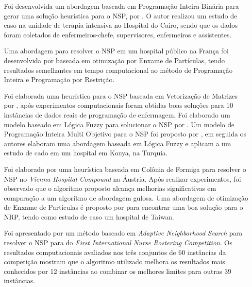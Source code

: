 Foi desenvolvida um abordagem baseada em Programação Inteira Binária para gerar uma solução heurística para o \ac{NSP}, por \cite{Zen-El-Din:2012}. O autor realizou um estudo de caso  na unidade de terapia intensiva no Hospital do Cairo, sendo que os dados foram coletados de enfermeiros-chefe, supervisores, enfermeiros e assistentes.

Uma abordagem para resolver o \ac{NSP} em um hospital público na França foi desenvolvida por \cite{altamirano:2010} baseada em otimização por Enxame de Partículas, tendo resultados semelhantes em tempo computacional ao método de Programação Inteira e Programação por Restrição.

Foi elaborada uma heurística para o \ac{NSP} baseada em Vetorização de Matrizes por \cite{yindong:2008}, após experimentos computacionais foram obtidas boas soluções para 10 instâncias de dados reais de programação de enfermagem. 
Foi elaborado um modelo baseado em Lógica Fuzzy para solucionar o \ac{NSP} por \cite{topaloglu:2010}.
Um modelo de Programação Inteira Multi Objetivo para o \ac{NSP} foi proposto por \cite{cetin:2015}, em seguida os autores elaboram uma abordagem baseada em Lógica Fuzzy e aplicam a um estudo de cado em um hospital em Konya, na Turquia.

Foi elaborado por \cite{gutjahra:2007} uma heurística baseada em Colônia de Formiga para resolver o \ac{NSP} no \textit{Vienna Hospital Compound} na Áustria. Após realizar experimentos, foi observado que o algoritmo proposto alcança melhorias significativas em comparação a um algoritmo de abordagem gulosa.
Uma abordagem de otimização de Enxame de Particulas é proposto por \cite{wu:2015} para encontrar uma boa solução para o \ac{NRP}, tendo como estudo de caso um hospital de Taiwan. 


Foi apresentado por \cite{lu:2012} um método baseado em \textit{Adaptive Neighborhood Search} para resolver o \ac{NSP} para do \textit{ First International Nurse Rostering Competition}.  Os resultados computacionais avaliados nos três conjuntos de 60 instâncias da competição mostram que o algoritmo utilizado melhora os resultados mais conhecidos por 12 instâncias ao combinar os melhores limites para outras 39 instâncias.

